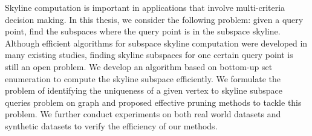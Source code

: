 
%
%


Skyline computation is important in applications that involve multi-criteria decision making. In this thesis, we consider the following problem: given a query point, find the subspaces where the query point is in the subspace skyline. Although efficient algorithms for subspace skyline computation were developed in many existing studies, finding skyline subspaces for one certain query point is still an open problem. We develop an algorithm based on bottom-up set enumeration to compute the skyline subspace efficiently. We formulate the problem of identifying the uniqueness of a given vertex to skyline subspace queries problem on graph and proposed effective pruning methods to tackle this problem. We further conduct experiments on both real world datasets and synthetic datasets to verify the efficiency of our methods.
